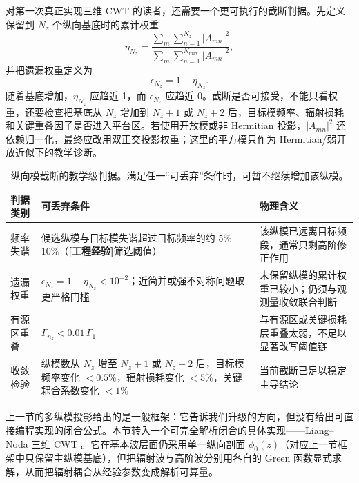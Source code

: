 对第一次真正实现三维 CWT 的读者，还需要一个更可执行的截断判据。先定义保留到 $N_z$ 个纵向基底时的累计权重
\begin{equation}
\eta_{N_z}
=
\frac{\sum_{m}\sum_{n=1}^{N_z}|A_{mn}|^2}
{\sum_{m}\sum_{n=1}^{N_{\max}}|A_{mn}|^2},
\label{eq:vertical_truncation_ratio}
\end{equation}
并把遗漏权重定义为
\begin{equation}
\epsilon_{N_z}=1-\eta_{N_z}.
\label{eq:vertical_truncation_omission}
\end{equation}
随着基底增加，$\eta_{N_z}$ 应趋近 1，而 $\epsilon_{N_z}$ 应趋近 0。截断是否可接受，不能只看权重，还要检查把基底从 $N_z$ 增加到 $N_z+1$ 或 $N_z+2$ 后，目标模频率、辐射损耗和关键重叠因子是否进入平台区。若使用开放模或非 Hermitian 投影，$|A_{mn}|^2$ 还依赖归一化，最终应改用双正交投影权重；这里的平方模只作为 Hermitian/弱开放近似下的教学诊断。

\begin{table}[htbp]
  \centering
  \footnotesize
  \caption{纵向模截断的教学级判据。满足任一“可丢弃”条件时，可暂不继续增加该纵模。}
  \label{tab:cwt_vertical_truncation}
  \begin{tabularx}{\textwidth}{@{}p{2.8cm}p{4.0cm}Y@{}}
    \toprule
    判据类别 & 可丢弃条件 & 物理含义 \\ \midrule
    频率失谐 & 候选纵模与目标模失谐超过目标频率的约 $5\%$--$10\%$（\textbf{[工程经验]}筛选阈值） & 该纵模已远离目标频段，通常只剩高阶修正作用 \\ 
    遗漏权重 & $\epsilon_{N_z}=1-\eta_{N_z}<10^{-2}$；近简并或强不对称问题取更严格门槛 & 未保留纵模的累计权重已较小；仍须与观测量收敛联合判断 \\
    有源区重叠 & $\Gamma_{n_z}<0.01\,\Gamma_1$ & 与有源区或关键损耗层重叠太弱，不足以显著改写阈值链 \\ 
    收敛检验 & 纵模数从 $N_z$ 增至 $N_z+1$ 或 $N_z+2$ 后，目标模频率变化 $<0.5\%$，辐射损耗变化 $<5\%$，关键耦合系数变化 $<1\%$ & 当前截断已足以稳定主导结论 \\ 
    \bottomrule
  \end{tabularx}
\end{table}

上一节的多纵模投影给出的是一般框架：它告诉我们升级的方向，但没有给出可直接编程实现的闭合公式。本节转入一个可完全解析闭合的具体实现——Liang--Noda 三维 CWT \cite{liang2012square}。它在基本波层面仍采用单一纵向剖面 $\phi_0(z)$（对应上一节框架中只保留主纵模基底），但把辐射波与高阶波分别用各自的 Green 函数显式求解，从而把辐射耦合从经验参数变成解析可算量。

